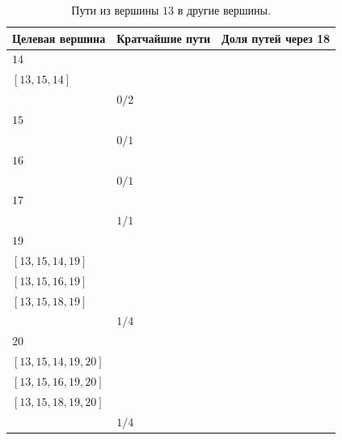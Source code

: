 \documentclass[12pt, a4paper]{extarticle}
\begin{document}
\begin{table}[h!]
    \caption{Пути из вершины $13$ в другие вершины.}
    \label{tbl:10-13}
    \begin{tabularx}{\textwidth}{|X|X|X|}
        \hline 
        Целевая вершина & Кратчайшие пути & Доля путей через 18 \\
        \hline 
        $14$ & \begin{tabular}{@{}l@{}} $[13, 9, 14]$ \\  $[13, 15, 14]$ \\ \end{tabular} & $0/2$ \\
        \hline
        $15$ & \begin{tabular}{@{}l@{}} $[13, 15]$ \\ \end{tabular} & $0/1$ \\
        \hline
        $16$ & \begin{tabular}{@{}l@{}} $[13, 15, 16]$ \\ \end{tabular} & $0/1$ \\
        \hline
        $17$ & \begin{tabular}{@{}l@{}} $[13, 15, 18, 17]$ \\ \end{tabular} & $1/1$ \\
        \hline
        $19$ & \begin{tabular}{@{}l@{}} $[13, 9, 14, 19]$ \\  $[13, 15, 14, 19]$ \\  $[13, 15, 16, 19]$ \\  $[13, 15, 18, 19]$ \\ \end{tabular} & $1/4$ \\
        \hline
        $20$ & \begin{tabular}{@{}l@{}} $[13, 9, 14, 19, 20]$ \\  $[13, 15, 14, 19, 20]$ \\  $[13, 15, 16, 19, 20]$ \\  $[13, 15, 18, 19, 20]$ \\ \end{tabular} & $1/4$ \\
        \hline
    \end{tabularx}
\end{table}
\end{document}
